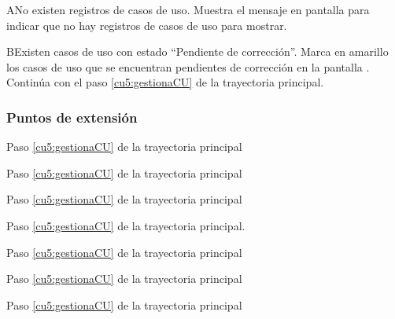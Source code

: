  \begin{UCtrayectoriaA}{A}{No existen registros de casos de uso.}
    \UCpaso[\UCsist] Muestra el mensaje  en pantalla  
    para indicar que no hay registros de casos de uso para mostrar.
 \end{UCtrayectoriaA}
 
 \begin{UCtrayectoriaA}{B}{Existen casos de uso con estado ``Pendiente de corrección''.}
    \UCpaso[\UCsist] Marca en amarillo los casos de uso que se encuentran pendientes de corrección en la pantalla .
    \UCpaso[] Continúa con el paso \ref{cu5:gestionaCU} de la trayectoria principal.
	
 \end{UCtrayectoriaA}
 

\subsubsection{Puntos de extensión}

	{Paso \ref{cu5:gestionaCU} de la trayectoria principal}
	{}

	{Paso \ref{cu5:gestionaCU} de la trayectoria principal}
	{}
	
	{Paso \ref{cu5:gestionaCU} de la trayectoria principal}
	{}
	
	{Paso \ref{cu5:gestionaCU} de la trayectoria principal.}
	{}

	{Paso \ref{cu5:gestionaCU} de la trayectoria principal}
	{}
	
	{Paso \ref{cu5:gestionaCU} de la trayectoria principal}
	{}
	
	{Paso \ref{cu5:gestionaCU} de la trayectoria principal}
	{}
	
